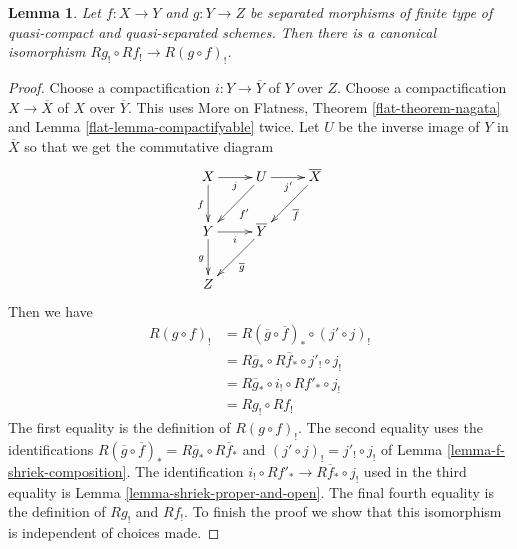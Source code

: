 \documentclass{stacks-project}
\theoremstyle{plain}
\newtheorem{lemma}[subsection]{Lemma}
\theoremstyle{definition}
\theoremstyle{remark}
\numberwithin{equation}{subsection}
\begin{document}
\begin{lemma}
\label{lemma-shriek-composition}
Let $f : X \to Y$ and $g : Y \to Z$ be separated morphisms of finite type
of quasi-compact and quasi-separated schemes. Then there is a canonical
isomorphism $Rg_! \circ Rf_! \to R(g \circ f)_!$.
\end{lemma}

\begin{proof}
Choose a compactification $i : Y \to \overline{Y}$ of $Y$ over $Z$.
Choose a compactification $X \to \overline{X}$ of $X$ over
$\overline{Y}$. This uses More on Flatness, Theorem \ref{flat-theorem-nagata}
and Lemma \ref{flat-lemma-compactifyable} twice.
Let $U$ be the inverse image of $Y$ in $\overline{X}$
so that we get the commutative diagram
$$
\xymatrix{
X \ar[r]_j \ar[d]_f &
U \ar[dl]^{f'} \ar[r]_{j'} &
\overline{X} \ar[dl]^{\overline{f}} \\
Y \ar[r]_i \ar[d]_g &
\overline{Y} \ar[dl]^{\overline{g}} \\
Z
}
$$
Then we have
\begin{align*}
R(g \circ f)_!
& =
R(\overline{g} \circ \overline{f})_* \circ (j' \circ j)_! \\
& =
R\overline{g}_* \circ R\overline{f}_* \circ j'_! \circ j_! \\
& =
R\overline{g}_* \circ i_! \circ Rf'_* \circ j_! \\
& =
Rg_! \circ Rf_!
\end{align*}
The first equality is the definition of $R(g \circ f)_!$.
The second equality uses the identifications
$R(\overline{g} \circ \overline{f})_* = R\overline{g}_* \circ R\overline{f}_*$
and $(j' \circ j)_! = j'_! \circ j_!$ of Lemma \ref{lemma-f-shriek-composition}.
The identification $i_! \circ Rf'_* \to R\overline{f}_* \circ j_!$
used in the third equality is Lemma \ref{lemma-shriek-proper-and-open}.
The final fourth equality is the definition of $Rg_!$ and $Rf_!$.
To finish the proof we show that
this isomorphism is independent of choices made.


\end{proof}
\end{document}
